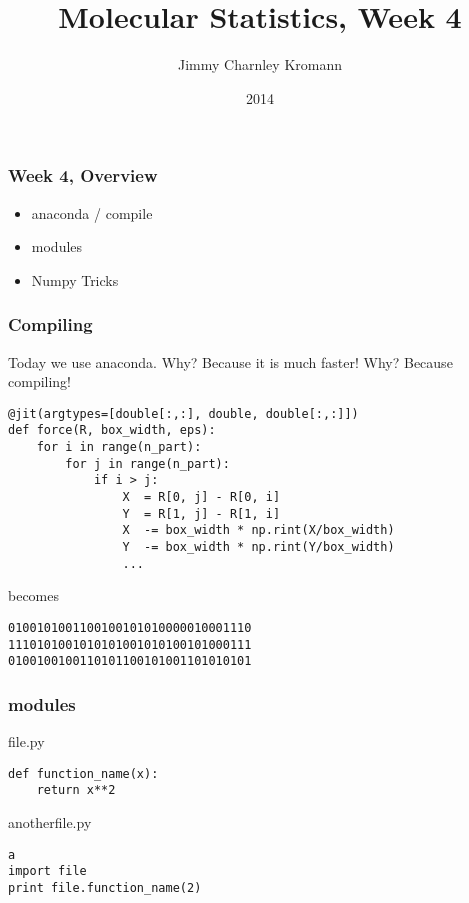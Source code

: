 \documentclass{beamer}
\title[]{Molecular Statistics, Week 4}
\institute[University of Copenhagen]{Department of Chemistry \\ University of Copenhagen}
\author[Jimmy Charnley Kromann]{Jimmy Charnley Kromann}
\date{2014}
\begin{document}
\frame[plain]{\titlepage}


\begin{frame}[fragile]

    \frametitle{Week 4, Overview}

    \begin{itemize}

        \item anaconda / compile

        \item modules

        \item Numpy Tricks


    \end{itemize}

\end{frame}


\begin{frame}[fragile]

    \frametitle{Compiling}

    Today we use anaconda. Why?\newline
    Because it is much faster! Why?\newline
    Because compiling!

\begin{lstlisting}
@jit(argtypes=[double[:,:], double, double[:,:]])
def force(R, box_width, eps):
    for i in range(n_part):
        for j in range(n_part):
            if i > j:
                X  = R[0, j] - R[0, i]
                Y  = R[1, j] - R[1, i]
                X  -= box_width * np.rint(X/box_width)
                Y  -= box_width * np.rint(Y/box_width)
                ...
\end{lstlisting}

    becomes

\begin{lstlisting}
0100101001100100101010000010001110
1110101001010101001010100101000111
0100100100110101100101001101010101
\end{lstlisting}


\end{frame}


\begin{frame}[fragile]

    \frametitle{modules}

file.py
\begin{lstlisting}
def function_name(x):
    return x**2

\end{lstlisting}

anotherfile.py
\begin{lstlisting}a
import file
print file.function_name(2)
\end{lstlisting}

\end{frame}
\end{document}
